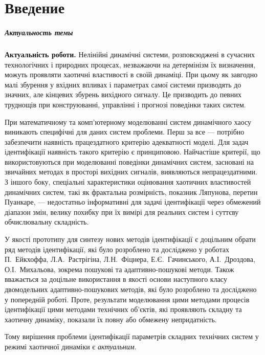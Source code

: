 \chapter*{Введение}

\paragraph{Актуальность темы}

\textbf{Актуальність роботи.}
Нелінійні динамічні системи, розповсюджені в сучасних технологічних і
природних процесах, незважаючи на детермінізм їх визначення, можуть проявляти
хаотичні властивості в своїй динаміці. При цьому як завгодно малі збурення у вхідних
впливах і параметрах самої системи призводять до значних, але кінцевих збурень
вихідного сигналу. Це призводить до певних труднощів при конструюванні,
управлінні і прогнозі поведінки таких систем.

При математичному та комп'ютерному моделюванні систем динамічного хаосу
виникають специфічні для даних систем проблеми. Перш за все --- потрібно
забезпечити наявність працездатного критерію адекватності моделі. Для задач
ідентифікації наявність такого критерію є принциповою. Найчастіше
критерії, що використовуються при моделюванні поведінки динамічних систем,
засновані
на звичайних методах в просторі вихідних сигналів, виявляються непрацездатними. З
іншого боку, спеціальні характеристики оцінювання хаотичних властивостей динамічних
систем, такі як фрактальна розмірність, показник Ляпунова, перетин Пуанкаре, ---
недостатньо інформативні для задачі ідентифікації через обмежений діапазон
змін, велику похибку при їх вимірі для реальних систем і суттєву
обчислювальну складність.

У якості прототипу для синтезу нових методів ідентифікації є доцільним обрати ряд
методів ідентифікації, які було розроблено та досліджено у роботах
П.~Ейкхоффа, Л.А.~Растрігіна, Л.Н.~Фіцнера, Е.Є.~Гачинського,
А.І.~Дроздова, О.І.~Михальова, зокрема пошукові та адаптивно-пошукові
методи.
Також вважається за доцільне використання в якості основи
наступного класу двомодельних адаптивно-пошукових методів,
які було розроблено та досліджено у попередній роботі.
Проте, результати моделювання цими методами
процесів ідентифікації цими методами
технічних об'єктів, які проявляють складну та хаотичну динаміку, показали
їх повну або обмежену непридатність.


Тому вирішення проблеми
ідентифікації параметрів складних технічних систем у режимі хаотичної динаміки
є \textit{актуальним}.

